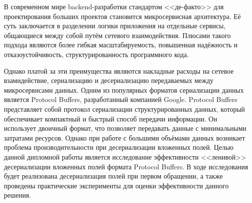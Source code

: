 
В современном мире backend-разработки стандартом <<де-факто>> для проектирования больших проектов становится микросервисная архитектура.
Её суть заключается в разделении логики приложения на отдельные сервисы, общающиеся между собой путём сетевого взаимодействия.
Плюсами такого подхода являются более гибкая масштабируемость, повышенная надёжность и отказоустойчивость, структурированность программного кода.

Однако платой за эти преимущества являются накладные расходы на сетевое взамидействие, сериализацию и десериализацию передаваемых между микросервисами данных.
Одним из популярных форматов сериализации данных является Protocol Buffers, разработанный компанией Google.
Protocol Buffers представляет собой протокол сериализации структурированных данных, который обеспечивает компактный и быстрый способ передачи информации. Он использует двоичный формат, что позволяет передавать данные с минимальными затратами ресурсов. Однако при работе с большими объёмами данных возникает проблема производительности при десериализации вложенных полей.
Целью данной дипломной работы является исследование эффективности <<ленивой>> десериализации вложенных полей формата Protocol Buffers. В ходе исследования будет реализована десериализация полей при первом обращении, а также проведены практические эксперименты для оценки эффективности данного решения.
